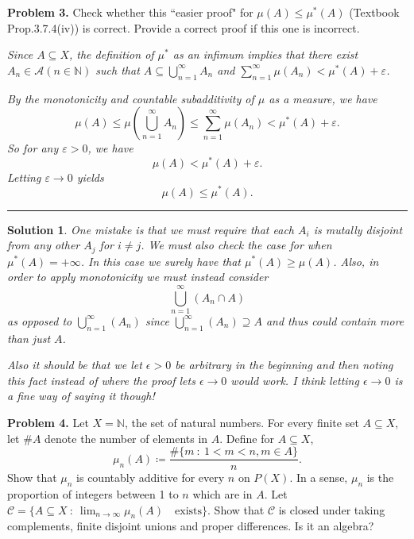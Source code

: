 \documentclass[leqno]{article}
\theoremstyle{nonumberplain}
\newtheorem{solution}{Solution}
\newcommand{\N}{\mathbb{N}}
\begin{document}
\noindent\textbf{Problem 3.} \quad
Check whether this ``easier proof" for $ \mu(A) \le \mu^*(A) $
(Textbook Prop.3.7.4(iv)) is correct.
Provide a correct proof if this one is incorrect.

\smallskip
\textit{
Since $ A \subseteq X $,
the definition of $ \mu^* $ as an infimum implies that
there exist $ A_n \in \mathcal{A} (n \in \mathbb{N}) $
such that $ A \subseteq \bigcup_{n=1}^\infty A_n $
and $ \sum_{n=1}^\infty \mu(A_n) < \mu^*(A) + \varepsilon $.}

\textit{
By the monotonicity and countable subadditivity of $ \mu $ as a measure,
we have
$$
  \mu(A) \le \mu(\bigcup_{n=1}^\infty A_n)
  \le \sum_{n=1}^\infty \mu(A_n)
  < \mu^*(A) + \varepsilon.
$$
So for any $ \varepsilon>0 $, we have
$$
  \mu(A) < \mu^*(A) + \varepsilon.
$$
Letting $ \varepsilon \to 0 $ yields
$$
  \mu(A) \le \mu^*(A).
$$
}

\noindent\rule[0.5ex]{\linewidth}{1pt}

\begin{solution}
One mistake is that we must require that each $A_i$ is mutally disjoint from any other $A_j$ for $i\neq j$. We must also check the case for when $\mu^*(A)=+\infty$.  In this case we surely have that $\mu^*(A)\geq \mu(A)$. Also, in order to apply monotonicity we must instead consider
\[
\bigcup_{n=1}^\infty (A_n \cap A)
\]
as opposed to $\bigcup_{n=1}^\infty (A_n)$ since $\bigcup_{n=1}^\infty (A_n)\supseteq A$ and thus could contain more than just $A$.

Also it should be that we let $\epsilon>0$ be arbitrary in the beginning and then noting this fact instead of where the proof lets $\epsilon \to 0$ would work. I think letting $\epsilon \to 0$ is a fine way of saying it though!
\end{solution}

\pagebreak




\noindent\textbf{Problem 4.} \quad
Let $X =\N$, the set of natural numbers. For every finite set $A \subseteq X$, let $\# A$ denote the number of elements in $A$. Define for $A\subseteq X$, 
\[
\mu_n (A) \coloneqq \frac{\# \{m~\colon~ 1 < m < n,m \in A\}}{n}.
\]
Show that $\mu_n$ is countably additive for every $n$ on $P(X)$. In a sense, $\mu_n$ is the proportion of integers between 1 to $n$ which are in $A$. Let $\mathcal{C} = \{A \subseteq X ~\colon~ \lim_{n\to \infty} \mu_n (A) \quad\textrm{exists}\}$. Show that $\mathcal{C}$ is closed under taking complements, finite disjoint unions and proper differences. Is it an algebra?
\end{document}
